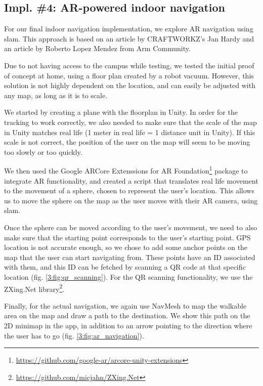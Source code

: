     \subsection{Impl. \#4: AR-powered indoor navigation}\label{3:impl4}
    
        For our final indoor navigation implementation, we explore AR navigation using \acrshort{slam}. This approach is based on an article by CRAFTWORKZ's Jan Hardy\cite{hardy2020arnavigation} and an article by Roberto Lopez Mendez from Arm Community\cite{mendez2018arnavigation}.
        
        Due to not having access to the campus while testing, we tested the initial proof of concept at home, using a floor plan created by a robot vacuum. However, this solution is not highly dependent on the location, and can easily be adjusted with any map, as long as it is to scale.
        
        We started by creating a plane with the floorplan in Unity. In order for the tracking to work correctly, we also needed to make sure that the scale of the map in Unity matches real life (1 meter in real life = 1 distance unit in Unity). If this scale is not correct, the position of the user on the map will seem to be moving too slowly or too quickly.
        
        We then used the Google ARCore Extenssions for AR Foundation\footnote{\url{https://github.com/google-ar/arcore-unity-extensions}} package to integrate AR functionality, and created a script that translates real life movement to the movement of a sphere, chosen to represent the user's location. This allows us to move the sphere on the map as the user moves with their AR camera, using \acrshort{slam}.
        
        Once the sphere can be moved according to the user's movement, we need to also make sure that the starting point corresponds to the user's starting point. GPS location is not accurate enough, so we chose to add some anchor points on the map that the user can start navigating from. These points have an ID associated with them, and this ID can be fetched by scanning a QR code at that specific location (fig. \ref{3:fig:qr_scanning}). For the QR scanning functionality, we use the ZXing.Net library\footnote{\url{https://github.com/micjahn/ZXing.Net}}.
        
        Finally, for the actual navigation, we again use NavMesh to map the walkable area on the map and draw a path to the destination. We show this path on the 2D minimap in the app, in addition to an arrow pointing to the direction where the user has to go (fig. \ref{3:fig:ar_navigation}).
        
